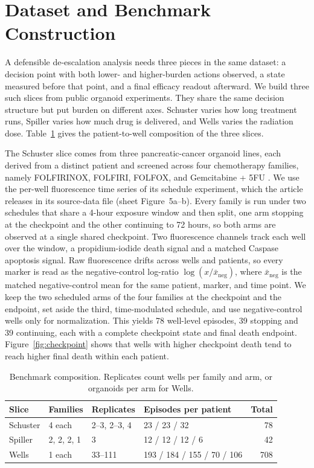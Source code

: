 \documentclass[conference]{IEEEtran}
\begin{document}
\section{Dataset and Benchmark Construction}
\label{sec:data}

A defensible de-escalation analysis needs three pieces in the same dataset: a decision point with both lower- and higher-burden actions observed, a state measured before that point, and a final efficacy readout afterward. We build three such slices from public organoid experiments. They share the same decision structure but put burden on different axes. Schuster varies how long treatment runs, Spiller varies how much drug is delivered, and Wells varies the radiation dose. Table~\ref{tab:composition} gives the patient-to-well composition of the three slices.

The Schuster slice comes from three pancreatic-cancer organoid lines, each derived from a distinct patient and screened across four chemotherapy families, namely FOLFIRINOX, FOLFIRI, FOLFOX, and Gemcitabine + 5FU \cite{schuster2020}. We use the per-well fluorescence time series of its schedule experiment, which the article releases in its source-data file (sheet Figure~5a--b). Every family is run under two schedules that share a 4-hour exposure window and then split, one arm stopping at the checkpoint and the other continuing to 72 hours, so both arms are observed at a single shared checkpoint. Two fluorescence channels track each well over the window, a propidium-iodide death signal and a matched Caspase apoptosis signal. Raw fluorescence drifts across wells and patients, so every marker is read as the negative-control log-ratio \(\log(x/\bar{x}_{\mathrm{neg}})\), where \(\bar{x}_{\mathrm{neg}}\) is the matched negative-control mean for the same patient, marker, and time point. We keep the two scheduled arms of the four families at the checkpoint and the endpoint, set aside the third, time-modulated schedule, and use negative-control wells only for normalization. This yields 78 well-level episodes, 39 stopping and 39 continuing, each with a complete checkpoint state and final death endpoint. Figure~\ref{fig:checkpoint} shows that wells with higher checkpoint death tend to reach higher final death within each patient.

\begin{table}[t]
\caption{Benchmark composition. Replicates count wells per family and arm, or organoids per arm for Wells.}
\label{tab:composition}
\centering
\footnotesize
\setlength{\tabcolsep}{3.5pt}
\begin{tabular}{@{}llllr@{}}
\toprule
Slice & Families & Replicates & Episodes per patient & Total \\
\midrule
Schuster & 4 each & 2--3, 2--3, 4 & 23 / 23 / 32 & 78 \\
Spiller & 2, 2, 2, 1 & 3 & 12 / 12 / 12 / 6 & 42 \\
Wells & 1 each & 33--111 & 193 / 184 / 155 / 70 / 106 & 708 \\
\bottomrule
\end{tabular}
\end{table}
\end{document}
